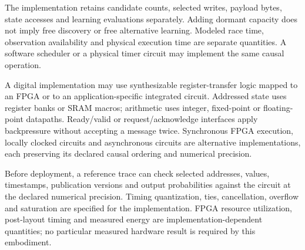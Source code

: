 \documentclass[pct]{sm-patent}
\begin{document}
\pnum The implementation retains candidate counts, selected writes, payload bytes, state accesses and learning evaluations separately. Adding dormant capacity does not imply free discovery or free alternative learning. Modeled race time, observation availability and physical execution time are separate quantities. A software scheduler or a physical timer circuit may implement the same causal operation.


\pnum A digital implementation may use synthesizable register-transfer logic mapped to an FPGA or to an application-specific integrated circuit. Addressed state uses register banks or SRAM macros; arithmetic uses integer, fixed-point or floating-point datapaths. Ready/valid or request/acknowledge interfaces apply backpressure without accepting a message twice. Synchronous FPGA execution, locally clocked circuits and asynchronous circuits are alternative implementations, each preserving its declared causal ordering and numerical precision.

\pnum Before deployment, a reference trace can check selected addresses, values, timestamps, publication versions and output probabilities against the circuit at the declared numerical precision. Timing quantization, ties, cancellation, overflow and saturation are specified for the implementation. FPGA resource utilization, post-layout timing and measured energy are implementation-dependent quantities; no particular measured hardware result is required by this embodiment.

\claimsstart
\end{document}
